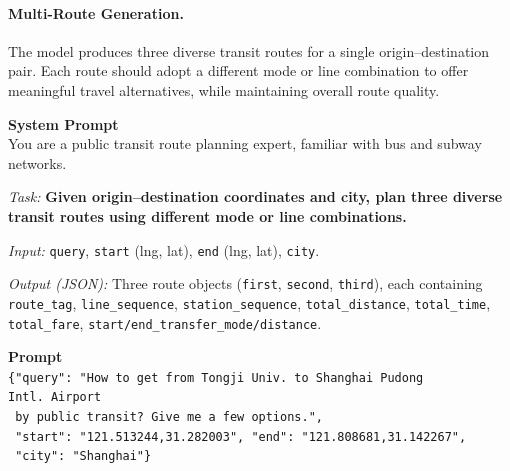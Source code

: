 \documentclass{article}
\begin{document}
\paragraph{Multi-Route Generation.}
The model produces three diverse transit routes for a single origin--destination pair. Each route should adopt a different mode or line combination to offer meaningful travel alternatives, while maintaining overall route quality.
\begin{tcolorbox}[colback=gray!3, colframe=black!40, boxrule=0.4pt, arc=2pt, left=6pt, right=6pt, top=4pt, bottom=4pt, fontupper=\small, fontlower=\small, breakable, title={\small\textbf{Prompt \& Label}}]
\textbf{System Prompt} \\[2pt]
You are a public transit route planning expert, familiar with bus and subway networks.

\textit{Task:} \textbf{Given origin--destination coordinates and city, plan three diverse transit routes using different mode or line combinations.}

\textit{Input:} \texttt{query}, \texttt{start} (lng, lat), \texttt{end} (lng, lat), \texttt{city}.

\textit{Output (JSON):} Three route objects (\texttt{first}, \texttt{second}, \texttt{third}), each containing \texttt{route\_tag}, \texttt{line\_sequence}, \texttt{station\_sequence}, \texttt{total\_distance}, \texttt{total\_time}, \texttt{total\_fare}, \texttt{start/end\_transfer\_mode/distance}.

\tcblower

\textbf{Prompt} \\[2pt]
\texttt{\{"query": "How to get from Tongji Univ.\ to Shanghai Pudong Intl.\ Airport} \\
\texttt{~by public transit? Give me a few options.",} \\
\texttt{~"start": "121.513244,31.282003", "end": "121.808681,31.142267",} \\
\texttt{~"city": "Shanghai"\}}


\end{tcolorbox}
\end{document}
